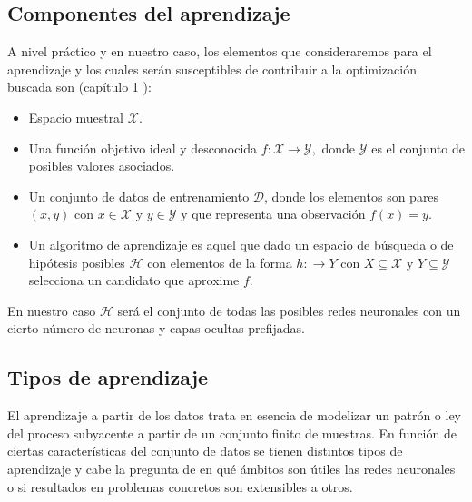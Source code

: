 \subsection{Componentes del aprendizaje}\label{sub:componentes_aprendizaje}  
A nivel práctico y en nuestro caso, los elementos que consideraremos para el aprendizaje y los cuales 
serán susceptibles de contribuir a la optimización buscada son
(capítulo 1 \cite{MostafaLearningFromData}): 


\begin{itemize}
    \item Espacio muestral $\mathcal X$.  
    \item Una función objetivo ideal y desconocida
     $f: \mathcal X \longrightarrow \mathcal{Y},$ 
     donde  $\mathcal{Y}$ es el conjunto de posibles valores asociados. 
    \item Un conjunto de datos de entrenamiento $\mathcal D$, donde los elementos son pares $(x,y)$ con $x \in  \mathcal X$ y 
    $y \in \mathcal{Y}$ y que representa una observación $f(x)=y.$
    \item Un algoritmo de aprendizaje es aquel que dado un espacio de búsqueda o de hipótesis posibles
    $\mathcal{H}$ con elementos de la forma $h: \longrightarrow Y$ con 
    $X \subseteq \mathcal X$ y $Y \subseteq \mathcal Y$ selecciona un candidato que aproxime $f$.
\end{itemize}

En nuestro caso $\mathcal{H}$ será el conjunto de todas las posibles redes neuronales con un cierto 
número de neuronas y capas ocultas prefijadas. 


\subsection{Tipos de aprendizaje}  

El aprendizaje a partir de los datos trata en esencia de modelizar un patrón o ley del proceso subyacente a partir de un conjunto finito de muestras.  
En función de ciertas características del conjunto de datos se 
tienen distintos tipos de aprendizaje y cabe la pregunta de en qué ámbitos son útiles las redes neuronales o si resultados en problemas 
 concretos 
son extensibles a otros. 

